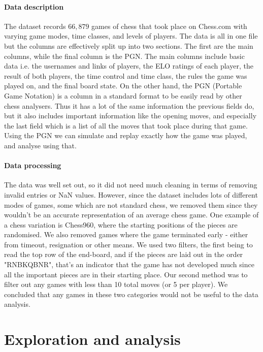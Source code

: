 \documentclass[10pt,a4paper,twocolumn]{article}
\begin{document}
\paragraph{Data description}
The dataset records $66,879$ games of chess that took place on Chess.com with varying game modes, time classes, and levels of players. The data is all in one file but the columns are effectively split up into two sections. The first are the main columns, while the final column is the PGN. The main columns include basic data i.e. the usernames and links of players, the ELO ratings of each player, the result of both players, the time control and time class, the rules the game was played on, and the final board state. On the other hand, the PGN (Portable Game Notation) is a column in a standard format to be easily read by other chess analysers. Thus it has a lot of the same information the previous fields do, but it also includes important information like the opening moves, and especially the last field which is a list of all the moves that took place during that game. Using the PGN we can simulate and replay exactly how the game was played, and analyse using that.

\paragraph{Data processing}
The data was well set out, so it did not need much cleaning in terms of removing invalid entries or NaN values. However, since the dataset includes lots of different modes of games, some which are not standard chess, we removed them since they wouldn't be an accurate representation of an average chess game. One example of a chess variation is Chess960, where the starting positions of the pieces are randomised.
We also removed games where the game terminated early - either from timeout, resignation or other means. We used two filters, the first being to read the top row of the end-board, and if the pieces are laid out in the order "RNBKQBNR", that's an indicator that the game has not developed much since all the important pieces are in their starting place. Our second method was to filter out any games with less than 10 total moves (or 5 per player). We concluded that any games in these two categories would not be useful to the data analysis.

\section{Exploration and  analysis}
\end{document}
